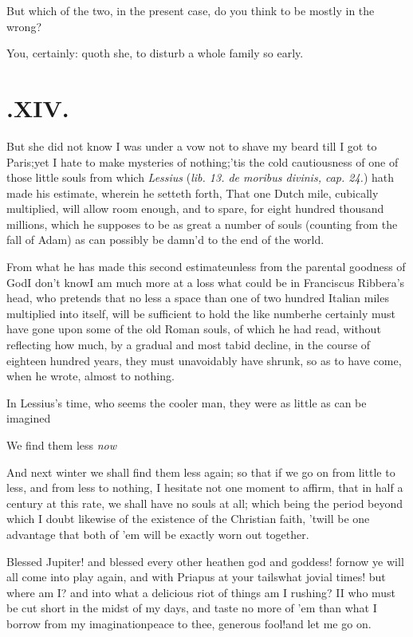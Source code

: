 \documentclass{article}
\begin{document}
\tsh But which of the two, in the present case, do you
think to be mostly in the wrong?

You, certainly\thinspace: quoth she, to disturb a whole family so
early.

\newpage
\section{.\enspace XIV.}

\quad\tsh But she did not know I was under a vow not to
shave my beard till I got to Paris;\tsh yet I hate
to make mysteries of nothing;\tsh ’tis the cold
cautiousness of one of those little souls from which \textit{Lessius}
(\textit{lib. 13. de moribus divinis, cap. 24.}) hath made his estimate,
wherein he setteth forth, That one Dutch mile, cubically
multiplied, will allow room enough, and to spare, for eight hundred
thousand millions, which he supposes to be as great a number of
souls (counting from the fall of Adam) as can possibly be
damn’d to the end of the world.

\newpage
From what he has made this second estimate\tsh unless
from the parental goodness of God\tsk I don’t know\tsk I
am much more at a loss what could be in Franciscus
Ribbera’s head, who pretends that no less a space than
one of two hundred Italian miles multiplied into itself,
will be sufficient to hold the like number\tsh he
certainly must have gone upon some of the old Roman souls,
of which he had read, without reflecting how much, by a gradual and
most tabid decline, in the course of eighteen hundred years, they
must unavoidably have shrunk, so as to have come, when he wrote,
almost to nothing.

\newpage
In Lessius’s time, who seems the cooler man, they
were as little as can be imagined\tsh

\tsh We find them less \textit{now}\tsh

And next winter we shall find them less again; so that if we go
on from little to less, and from less to nothing, I hesitate not
one moment to affirm, that in half a century at this rate, we shall
have no souls at all; which being the period beyond which I doubt
likewise of the existence of the Christian faith, ’twill be
one advantage that both of ’em will be exactly worn out
together.\tsh

Blessed Jupiter! and blessed every other heathen god and goddess! for\pb now ye will
all come into play again, and with Priapus at your tails\tsh\break what jovial times!\tsh
but where am I? and into what a delicious riot of things am I rushing? I\tsh I
who\break
must be cut short in the midst of my days, and taste no more of ’em than what I
borrow from my imagination\tsh peace to thee, generous fool!\break and let me go on.
\end{document}
